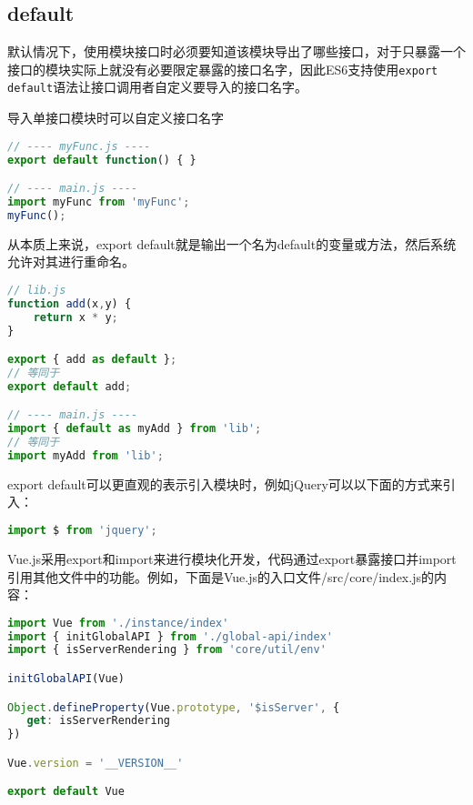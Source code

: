 \subsection{default}

默认情况下，使用模块接口时必须要知道该模块导出了哪些接口，对于只暴露一个接口的模块实际上就没有必要限定暴露的接口名字，因此ES6支持使用\texttt{export default}语法让接口调用者自定义要导入的接口名字。



\begin{example}
导入单接口模块时可以自定义接口名字
\begin{lstlisting}[language=JavaScript]
// ---- myFunc.js ----
export default function() { }

// ---- main.js ----
import myFunc from 'myFunc';
myFunc();
\end{lstlisting}
\end{example}

从本质上来说，export default就是输出一个名为default的变量或方法，然后系统允许对其进行重命名。




\begin{lstlisting}[language=JavaScript]
// lib.js
function add(x,y) {
    return x * y;
}

export { add as default };
// 等同于
export default add; 

// ---- main.js ----
import { default as myAdd } from 'lib';
// 等同于
import myAdd from 'lib';
\end{lstlisting}


export default可以更直观的表示引入模块时，例如jQuery可以以下面的方式来引入：




\begin{lstlisting}[language=JavaScript]
import $ from 'jquery';
\end{lstlisting}



Vue.js采用export和import来进行模块化开发，代码通过export暴露接口并import引用其他文件中的功能。例如，下面是Vue.js的入口文件/src/core/index.js的内容：

\begin{lstlisting}[language=JavaScript]
import Vue from './instance/index'
import { initGlobalAPI } from './global-api/index'
import { isServerRendering } from 'core/util/env'

initGlobalAPI(Vue)

Object.defineProperty(Vue.prototype, '$isServer', {
   get: isServerRendering
})

Vue.version = '__VERSION__'

export default Vue
\end{lstlisting}

